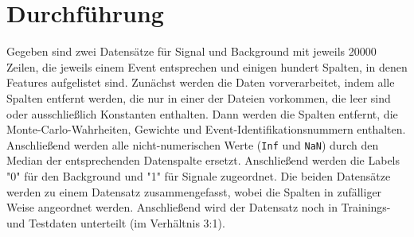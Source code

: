 \section{Durchführung}
\label{sec:Durchführung}

Gegeben sind zwei Datensätze für Signal und Background mit jeweils 20000 Zeilen, die jeweils einem Event entsprechen und einigen hundert Spalten, in denen Features aufgelistet sind. Zunächst werden die Daten vorverarbeitet, indem alle Spalten entfernt werden, die nur in einer der Dateien vorkommen, die leer sind oder ausschließlich Konstanten enthalten. Dann werden die Spalten entfernt, die Monte-Carlo-Wahrheiten, Gewichte und Event-Identifikationsnummern enthalten. Anschließend werden alle nicht-numerischen Werte (\texttt{Inf} und \texttt{NaN}) durch den Median der entsprechenden Datenspalte ersetzt. Anschließend werden die Labels "0" für den Background und "1" für Signale zugeordnet. Die beiden Datensätze werden zu einem Datensatz zusammengefasst, wobei die Spalten in zufälliger Weise angeordnet werden. Anschließend wird der Datensatz noch in Trainings- und Testdaten unterteilt (im Verhältnis 3:1). 